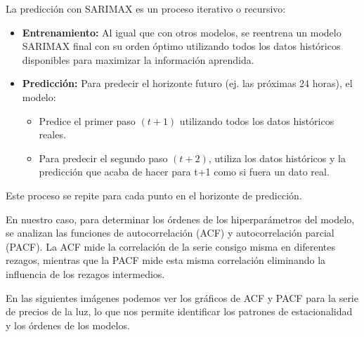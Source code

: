 La predicción con SARIMAX es un proceso iterativo o recursivo:
\begin{itemize}
    \item \textbf{Entrenamiento:} Al igual que con otros modelos, se reentrena un modelo SARIMAX final con su orden óptimo utilizando todos los datos históricos disponibles para maximizar la información aprendida.
    
    \item \textbf{Predicción:} Para predecir el horizonte futuro (ej. las próximas 24 horas), el modelo:
    \begin{itemize}
        \item Predice el primer paso $(t+1)$ utilizando todos los datos históricos reales.
        \item Para predecir el segundo paso $(t+2)$, utiliza los datos históricos y la predicción que acaba de hacer para t+1 como si fuera un dato real.
    \end{itemize}
\end{itemize}

Este proceso se repite para cada punto en el horizonte de predicción.

En nuestro caso, para determinar los órdenes de los hiperparámetros del modelo, se analizan las funciones de autocorrelación (ACF) y autocorrelación parcial (PACF). La ACF mide la correlación de la serie consigo misma en diferentes rezagos, mientras que la PACF mide esta misma correlación eliminando la influencia de los rezagos intermedios.

En las siguientes imágenes podemos ver los gráficos de ACF y PACF para la serie de precios de la luz, lo que nos permite identificar los patrones de estacionalidad y los órdenes de los modelos.

